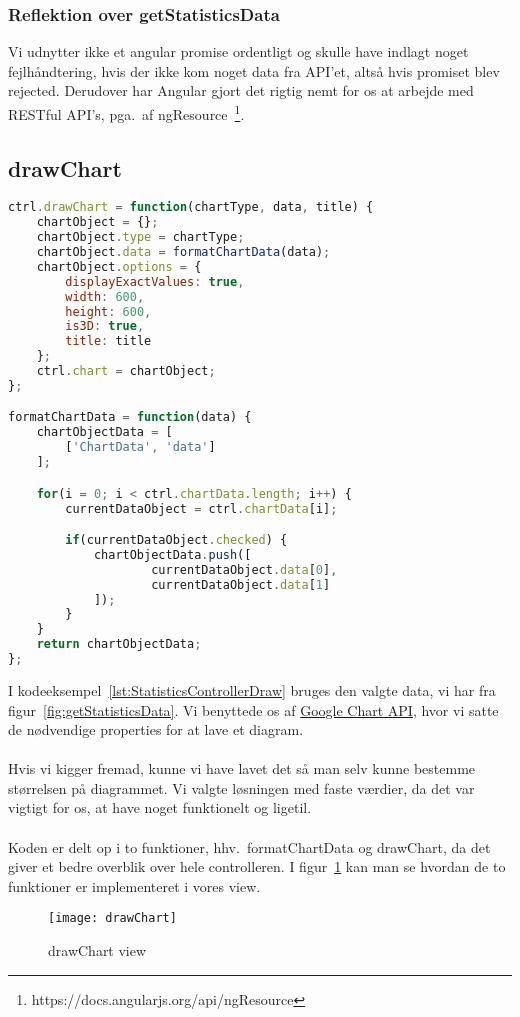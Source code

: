 \subsubsection{Reflektion over getStatisticsData}
Vi udnytter ikke et angular promise ordentligt og skulle have indlagt noget fejlhåndtering, hvis der ikke kom noget data fra API'et, altså hvis promiset blev rejected.
Derudover har Angular gjort det rigtig nemt for os at arbejde med RESTful API's, pga.\ af ngResource~\footnote{https://docs.angularjs.org/api/ngResource}.
\subsection{drawChart}
\begin{lstlisting}[caption={drawChart}, language={JavaScript}, label={lst:StatisticsControllerDraw}]
ctrl.drawChart = function(chartType, data, title) {
    chartObject = {};
    chartObject.type = chartType;
    chartObject.data = formatChartData(data);
    chartObject.options = {
        displayExactValues: true,
        width: 600,
        height: 600,
        is3D: true,
        title: title
    };
    ctrl.chart = chartObject;
};

formatChartData = function(data) {
    chartObjectData = [
        ['ChartData', 'data']
    ];

    for(i = 0; i < ctrl.chartData.length; i++) {
        currentDataObject = ctrl.chartData[i];

        if(currentDataObject.checked) {
            chartObjectData.push([
                    currentDataObject.data[0],
                    currentDataObject.data[1]
            ]);
        }
    }
    return chartObjectData;
};
\end{lstlisting}
I kodeeksempel~\ref{lst:StatisticsControllerDraw} bruges den valgte data, vi har fra figur~\ref{fig:getStatisticsData}.
Vi benyttede os af \hyperlink{GoogleChartAPI}{Google Chart API}, hvor vi satte de nødvendige properties for at lave et diagram.
\\\\
Hvis vi kigger fremad, kunne vi have lavet det så man selv kunne bestemme størrelsen på diagrammet.
Vi valgte løsningen med faste værdier, da det var vigtigt for os, at have noget funktionelt og ligetil.
\\\\
Koden er delt op i to funktioner, hhv.\ formatChartData og drawChart, da det giver et bedre overblik over hele controlleren.
I figur~\ref{fig:drawChart} kan man se hvordan de to funktioner er implementeret i vores view.
\begin{figure}[H]
\centering
\texttt{[image: drawChart]}
\caption{drawChart view}
\label{fig:drawChart}
\end{figure}
